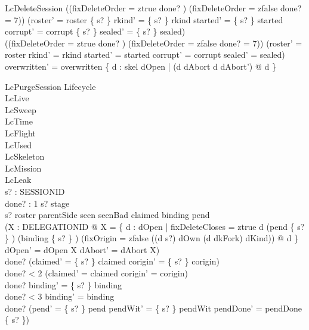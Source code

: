 \documentclass[a4paper,10pt,fleqn]{article}
\begin{document}
\begin{schema}{LcDeleteSession}
((fixDeleteOrder = ztrue \land done? ) \lor (fixDeleteOrder = zfalse \land done? = 7)) \implies (roster' = roster \setminus \{ s? \} \land rkind' = \{ s? \} \ndres rkind \land started' = \{ s? \} \ndres started \land corrupt' = corrupt \setminus \{ s? \} \land sealed' = \{ s? \} \ndres sealed) \\
\lnot ((fixDeleteOrder = ztrue \land done? ) \lor (fixDeleteOrder = zfalse \land done? = 7)) \implies (roster' = roster \land rkind' = rkind \land started' = started \land corrupt' = corrupt \land sealed' = sealed) \\
overwritten' = overwritten \cup \{ d : skel \setminus dOpen | (d \in dAbort \iff d \notin dAbort') @ d \}
\end{schema}

\begin{schema}{LcPurgeSession}
\Delta Lifecycle \\
\Xi LcLive \\
\Xi LcSweep \\
\Xi LcTime \\
\Xi LcFlight \\
\Xi LcUsed \\
\Xi LcSkeleton \\
\Xi LcMission \\
\Xi LcLeak \\
s? : SESSIONID \\
done? : 1 
\where
s? \notin \dom stage \\
s? \in roster \cup \dom parentSide \cup \dom seen \cup seenBad \cup \dom claimed \cup \dom binding \cup \dom pend \\
(\exists X : \power DELEGATIONID @ X = \{ d : dOpen | fixDeleteCloses = ztrue \land d \in (pend \limg \{ s? \} \rimg) \cup (binding \limg \{ s? \} \rimg) \land (fixOrigin = zfalse \lor ((d \mapsto s?) \in dOwn \land (d \mapsto dkFork) \in dKind)) @ d \} \land dOpen' = dOpen \setminus X \land dAbort' = dAbort \cup X) \\
done?  \implies (claimed' = \{ s? \} \ndres claimed \land corigin' = \{ s? \} \ndres corigin) \\
done? < 2 \implies (claimed' = claimed \land corigin' = corigin) \\
done?  \implies binding' = \{ s? \} \ndres binding \\
done? < 3 \implies binding' = binding \\
done?  \implies (pend' = \{ s? \} \ndres pend \land pendWit' = \{ s? \} \ndres pendWit \land pendDone' = pendDone \setminus \{ s? \}) \\

\end{schema}
\end{document}
